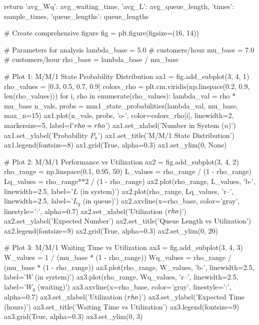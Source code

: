 \documentclass[a4paper, 11pt]{article}
\begin{document}
\begin{pycode}
    return {
        'avg_Wq': avg_waiting_time,
        'avg_L': avg_queue_length,
        'times': sample_times,
        'queue_lengths': queue_lengths
    }

# Create comprehensive figure
fig = plt.figure(figsize=(16, 14))

# Parameters for analysis
lambda_base = 5.0  # customers/hour
mu_base = 7.0      # customers/hour
rho_base = lambda_base / mu_base

# Plot 1: M/M/1 State Probability Distribution
ax1 = fig.add_subplot(3, 4, 1)
rho_values = [0.3, 0.5, 0.7, 0.9]
colors_rho = plt.cm.viridis(np.linspace(0.2, 0.9, len(rho_values)))
for i, rho in enumerate(rho_values):
    lambda_val = rho * mu_base
    n_vals, probs = mm1_state_probabilities(lambda_val, mu_base, max_n=15)
    ax1.plot(n_vals, probs, 'o-', color=colors_rho[i], linewidth=2,
             markersize=5, label=f'$\\rho={rho}$')
ax1.set_xlabel('Number in System ($n$)')
ax1.set_ylabel('Probability $P_n$')
ax1.set_title('M/M/1 State Distribution')
ax1.legend(fontsize=8)
ax1.grid(True, alpha=0.3)
ax1.set_ylim(0, None)

# Plot 2: M/M/1 Performance vs Utilization
ax2 = fig.add_subplot(3, 4, 2)
rho_range = np.linspace(0.1, 0.95, 50)
L_values = rho_range / (1 - rho_range)
Lq_values = rho_range**2 / (1 - rho_range)
ax2.plot(rho_range, L_values, 'b-', linewidth=2.5, label='$L$ (in system)')
ax2.plot(rho_range, Lq_values, 'r--', linewidth=2.5, label='$L_q$ (in queue)')
ax2.axvline(x=rho_base, color='gray', linestyle=':', alpha=0.7)
ax2.set_xlabel('Utilization ($\\rho$)')
ax2.set_ylabel('Expected Number')
ax2.set_title('Queue Length vs Utilization')
ax2.legend(fontsize=9)
ax2.grid(True, alpha=0.3)
ax2.set_ylim(0, 20)

# Plot 3: M/M/1 Waiting Time vs Utilization
ax3 = fig.add_subplot(3, 4, 3)
W_values = 1 / (mu_base * (1 - rho_range))
Wq_values = rho_range / (mu_base * (1 - rho_range))
ax3.plot(rho_range, W_values, 'b-', linewidth=2.5, label='$W$ (in system)')
ax3.plot(rho_range, Wq_values, 'r--', linewidth=2.5, label='$W_q$ (waiting)')
ax3.axvline(x=rho_base, color='gray', linestyle=':', alpha=0.7)
ax3.set_xlabel('Utilization ($\\rho$)')
ax3.set_ylabel('Expected Time (hours)')
ax3.set_title('Waiting Time vs Utilization')
ax3.legend(fontsize=9)
ax3.grid(True, alpha=0.3)
ax3.set_ylim(0, 3)


\end{pycode}
\end{document}
